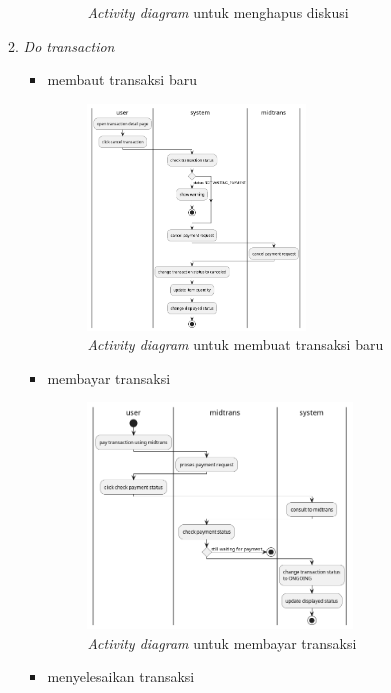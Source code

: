 \documentclass[a4paper]{article}
\begin{document}
\begin{enumerate}
\begin{enumerate}
\begin{itemize}
\begin{figure}[h]
                \caption{\textit{Activity diagram} untuk menghapus diskusi}
            \end{figure}
        \end{itemize}
        \newpage

        \item \textit{Do transaction}
        \begin{itemize}
            \item membaut transaksi baru
            \begin{figure}[h]
                \centering
                \includegraphics*[height=6cm]{./diagram/activity diagram/15. transaction/cancel transaction/cancel transaction.png}
                \caption{\textit{Activity diagram} untuk membuat transaksi baru}
            \end{figure}
            \item membayar transaksi
            \begin{figure}[h]
                \centering
                \includegraphics*[height=6cm]{./diagram/activity diagram/15. transaction/pay transaction/pay trx.png}
                \caption{\textit{Activity diagram} untuk membayar transaksi}
            \end{figure}
            \newpage
            \item menyelesaikan transaksi
            \begin{figure}[h]

\end{figure}
\end{itemize}
\end{enumerate}
\end{enumerate}
\end{document}
